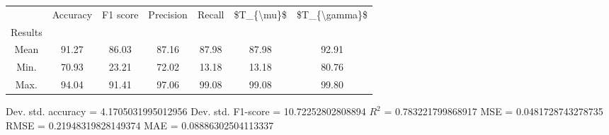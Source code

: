 \begin{tabular}{|c|c|c|c|c|c|c|}
\toprule
{} &  Accuracy &  F1 score &  Precision &  Recall &  \$T\_\{\textbackslash mu\}\$ &  \$T\_\{\textbackslash gamma\}\$ \\
Results &           &           &            &         &            &               \\
\hline
Mean    &     91.27 &     86.03 &      87.16 &   87.98 &      87.98 &         92.91 \\
Min.    &     70.93 &     23.21 &      72.02 &   13.18 &      13.18 &         80.76 \\
Max.    &     94.04 &     91.41 &      97.06 &   99.08 &      99.08 &         99.80 \\
\bottomrule
\end{tabular}

 Dev. std. accuracy = 4.1705031995012956
 Dev. std. F1-score = 10.72252802808894
 $R^2$ = 0.783221799868917
 MSE = 0.0481728743278735
 RMSE = 0.21948319828149374
 MAE = 0.08886302504113337